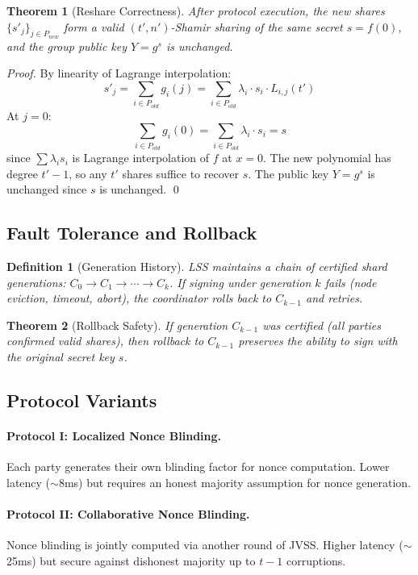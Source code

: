 \documentclass[11pt]{article}
\newtheorem{theorem}{Theorem}
\newtheorem{definition}{Definition}
\begin{document}
\begin{theorem}[Reshare Correctness]
After protocol execution, the new shares $\{s'_j\}_{j \in P_{new}}$ form a valid $(t', n')$-Shamir sharing of the same secret $s = f(0)$, and the group public key $Y = g^s$ is unchanged.
\end{theorem}

\begin{proof}
By linearity of Lagrange interpolation:
\[
  s'_j = \sum_{i \in P_{old}} g_i(j) = \sum_{i \in P_{old}} \lambda_i \cdot s_i \cdot L_{i,j}(t')
\]
At $j = 0$:
\[
  \sum_{i \in P_{old}} g_i(0) = \sum_{i \in P_{old}} \lambda_i \cdot s_i = s
\]
since $\sum \lambda_i s_i$ is Lagrange interpolation of $f$ at $x = 0$. The new polynomial has degree $t' - 1$, so any $t'$ shares suffice to recover $s$. The public key $Y = g^s$ is unchanged since $s$ is unchanged. \qed
\end{proof}

\subsection{Fault Tolerance and Rollback}

\begin{definition}[Generation History]
LSS maintains a chain of certified shard generations: $C_0 \to C_1 \to \cdots \to C_k$. If signing under generation $k$ fails (node eviction, timeout, abort), the coordinator rolls back to $C_{k-1}$ and retries.
\end{definition}

\begin{theorem}[Rollback Safety]
If generation $C_{k-1}$ was certified (all parties confirmed valid shares), then rollback to $C_{k-1}$ preserves the ability to sign with the original secret key $s$.
\end{theorem}

\subsection{Protocol Variants}

\paragraph{Protocol I: Localized Nonce Blinding.} Each party generates their own blinding factor for nonce computation. Lower latency ($\sim$8ms) but requires an honest majority assumption for nonce generation.

\paragraph{Protocol II: Collaborative Nonce Blinding.} Nonce blinding is jointly computed via another round of JVSS. Higher latency ($\sim$25ms) but secure against dishonest majority up to $t - 1$ corruptions.
\end{document}
